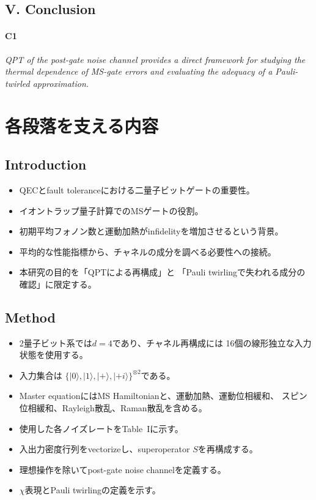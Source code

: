 \documentclass[dvipdfmx,a4paper,11pt]{jsarticle}
\newcommand{\topicsentence}[2]{%
  \paragraph{#1}\textit{#2}\par
}
\begin{document}
\subsection{V. Conclusion}

\topicsentence{C1}{QPT of the post-gate noise channel provides a direct framework for studying the thermal dependence of MS-gate errors and evaluating the adequacy of a Pauli-twirled approximation.}

\section{各段落を支える内容}

\subsection{Introduction}

\begin{itemize}
  \item QECとfault toleranceにおける二量子ビットゲートの重要性。
  \item イオントラップ量子計算でのMSゲートの役割。
  \item 初期平均フォノン数と運動加熱がinfidelityを増加させるという背景。
  \item 平均的な性能指標から、チャネルの成分を調べる必要性への接続。
  \item 本研究の目的を「QPTによる再構成」と
        「Pauli twirlingで失われる成分の確認」に限定する。
\end{itemize}

\subsection{Method}

\begin{itemize}
  \item 2量子ビット系では$d=4$であり、チャネル再構成には
        16個の線形独立な入力状態を使用する。
  \item 入力集合は
        $\{\lvert 0\rangle,\lvert 1\rangle,
        \lvert +\rangle,\lvert +i\rangle\}^{\otimes 2}$である。
  \item Master equationにはMS Hamiltonianと、運動加熱、運動位相緩和、
        スピン位相緩和、Rayleigh散乱、Raman散乱を含める。
  \item 使用した各ノイズレートをTable~Iに示す。
  \item 入出力密度行列をvectorizeし、superoperator $S$を再構成する。
  \item 理想操作を除いてpost-gate noise channelを定義する。
  \item $\chi$表現とPauli twirlingの定義を示す。
\end{itemize}
\end{document}
